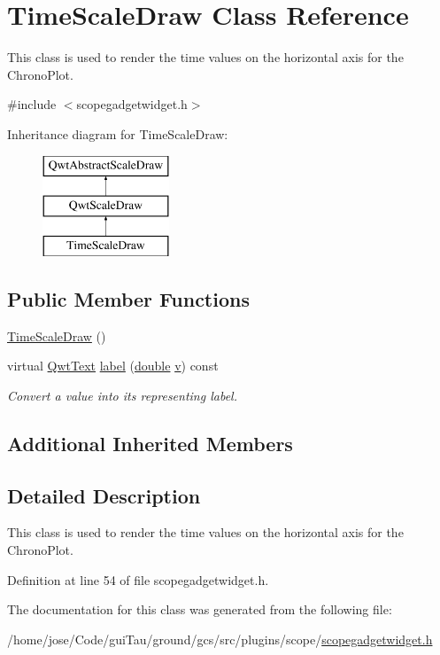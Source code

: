 \hypertarget{class_time_scale_draw}{\section{Time\-Scale\-Draw Class Reference}
\label{class_time_scale_draw}
}


This class is used to render the time values on the horizontal axis for the Chrono\-Plot.  




{\ttfamily \#include $<$scopegadgetwidget.\-h$>$}

Inheritance diagram for Time\-Scale\-Draw\-:\begin{figure}[H]
\begin{center}
\leavevmode
\includegraphics[height=3.000000cm]{class_time_scale_draw}
\end{center}
\end{figure}
\subsection*{Public Member Functions}
\begin{DoxyCompactItemize}
\item 
\hyperlink{group__scopeplugin_ga84399225e78ebb91c66163a637662f2a}{Time\-Scale\-Draw} ()
\item 
virtual \hyperlink{class_qwt_text}{Qwt\-Text} \hyperlink{group__scopeplugin_gadd46f1edfb468453018c231b7a1e92f2}{label} (\hyperlink{_super_l_u_support_8h_a8956b2b9f49bf918deed98379d159ca7}{double} \hyperlink{glext_8h_a14cfbe2fc2234f5504618905b69d1e06}{v}) const 
\begin{DoxyCompactList}\small\item\em Convert a value into its representing label. \end{DoxyCompactList}\end{DoxyCompactItemize}
\subsection*{Additional Inherited Members}


\subsection{Detailed Description}
This class is used to render the time values on the horizontal axis for the Chrono\-Plot. 

Definition at line 54 of file scopegadgetwidget.\-h.



The documentation for this class was generated from the following file\-:\begin{DoxyCompactItemize}
\item 
/home/jose/\-Code/gui\-Tau/ground/gcs/src/plugins/scope/\hyperlink{scopegadgetwidget_8h}{scopegadgetwidget.\-h}\end{DoxyCompactItemize}
